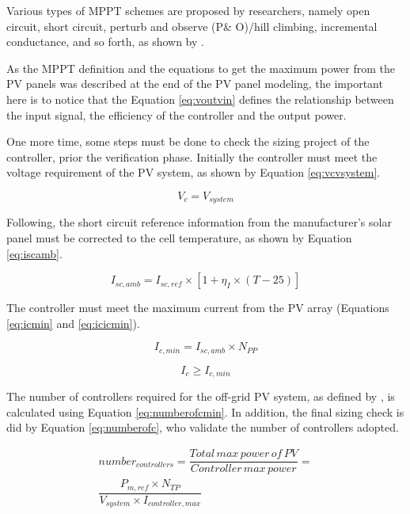 \documentclass[journal]{IEEEtran}
\begin{document}
Various types of MPPT schemes are proposed by researchers, namely open circuit, short circuit, perturb and observe (P\& O)/hill climbing, incremental conductance, and so forth, as shown by \cite{Haque}.
 
As the MPPT definition and the equations to get the maximum power from the PV panels was described at the end of the PV panel modeling, the important here is to notice that the Equation \ref{eq:voutvin} defines the relationship between the input signal, the efficiency of the controller and the output power.
 
One more time, some steps must be done to check the sizing project of the controller, prior the verification phase. Initially the controller must meet the voltage requirement of the PV system, as shown by Equation \ref{eq:vcvsystem}. 

\begin{equation}
\label{eq:vcvsystem}
V_{c} = V_{system}
\end{equation}

Following, the short circuit reference information from the manufacturer's solar panel must be corrected to the cell temperature, as shown by Equation \ref{eq:iscamb}.

\begin{equation}
\label{eq:iscamb}
I_{sc,amb} = I_{sc,ref} \times \left[ 1 + \eta_{I} \times (T-25) \right] 
\end{equation}

The controller must meet the maximum current from the PV array (Equations \ref{eq:icmin} and \ref{eq:icicmin}).

\begin{equation}
\label{eq:icmin}
I_{c,min} = I_{sc,amb} \times N_{PP}
\end{equation}

\begin{equation}
\label{eq:icicmin}
I_{c} \geq I_{c,min}
\end{equation}

The number of controllers required for the off-grid PV system, as defined by \cite{Yatimi}, is calculated using Equation \ref{eq:numberofcmin}. In addition, the final sizing check is did by Equation \ref{eq:numberofc}, who validate the number of controllers adopted.

\begin{multline}
\label{eq:numberofcmin}
number_{controllers} = \dfrac{Total \, max \, power \, of \, PV}{Controller \, max \, power} = \\ \dfrac{P_{m,ref} \times N_{TP}}{V_{system} \times I_{controller,max}}
\end{multline}
\end{document}
